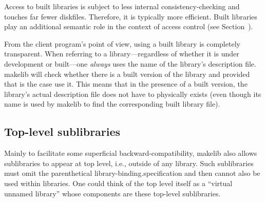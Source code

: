 Access to built libraries is subject to less internal
consistency-checking and touches far fewer diskfiles.
Therefore, it is typically more efficient.  Built libraries
play an additional semantic role in the context of access control (see
Section~).

From the client program's point of view, using a built library is
completely transparent.  When referring to a library---regardless of
whether it is under development or built---one {\em always} uses the
name of the library's description file.  makelib will check whether there
is a built version of the library and provided that is the case use
it.  This means that in the presence of a built version, the
library's actual description file does not have to physically exists
(even though its name is used by makelib to find the corresponding built
library file).

\subsection{Top-level sublibraries}

Mainly to facilitate some superficial backward-compatibility, makelib also
allows sublibraries to appear at top level, i.e., outside of any library.
Such sublibraries must omit the parenthetical library-binding.specification and then
cannot also be used within libraries. One could think of the top level
itself as a ``virtual unnamed library'' whose components are these
top-level sublibraries.

